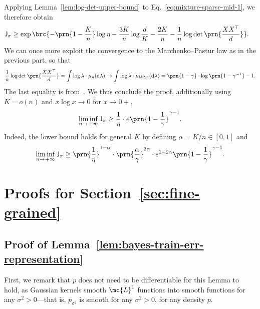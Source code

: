 \documentclass[11pt]{article}
\newcommand{\de}{\mathrm{d}}
\newcommand{\jfunc}{\mathsf{J}}
\begin{document}
Applying Lemma~\ref{lem:log-det-upper-bound} to Eq.~\eqref{eq:mixture-sparse-mid-1}, we therefore obtain
\begin{align*}
    \jfunc_{\pi} & \geq \exp \brc{-\prn{1 - \frac{K}{n}}\log \eta -\frac{3K}{n} \log \frac{d}{K} - \frac{2K}{n} - \frac{1}{n} \log \det \prn{\frac{XX^\top}{d}} }.
\end{align*}
We can once more exploit the convergence to the Marchenko–Pastur law as in the previous part, so that
\begin{align*}
\frac{1}{n} \log \det \prn{\frac{XX^\top}{d}} = \int \log \lambda \cdot \mu_n(\de \lambda) \to \int \log \lambda \cdot \mu_{\mathsf{MP}, \gamma} (\de \lambda) = \prn{1-\gamma} \cdot \log \prn{1-\gamma^{-1}} -1.
\end{align*}
The last equality is from~\cite[Example 1.1.1 \& Sec.~9.12.3]{bai2010spectral}. We thus conclude the proof, additionally using $K=o(n)$ and $x\log x \to 0$ for $x \to 0+$,
\begin{align*}
    \liminf_{n \to +\infty} \jfunc_{\pi} \geq \frac{1}{\eta} \cdot e \prn{1-\frac{1}{\gamma}}^{\gamma - 1}.
\end{align*}
Indeed, the lower bound holds for general $K$ by defining $\alpha = K/n \in[0, 1]$ and
\begin{align*}
    \liminf_{n \to +\infty} \jfunc_{\pi} \geq \prn{\frac{1}{\eta}}^{1-\alpha} \cdot \prn{\frac{\alpha}{\gamma}}^{3\alpha} \cdot e^{1-2\alpha} \prn{1-\frac{1}{\gamma}}^{\gamma - 1}.
\end{align*}

\section{Proofs for Section~\ref{sec:fine-grained}}

\subsection{Proof of Lemma~\ref{lem:bayes-train-err-representation}} \label{proof:bayes-train-err-representation}
First, we remark that $p$ does not need to be differentiable for this Lemma to hold, as Gaussian kernels smooth $\mc{L}^1$ functions into smooth functions for any $\sigma^2 > 0$---that is, $p_{\sigma^2}$ is smooth for any $\sigma^2>0$, for any density $p$.
\end{document}
